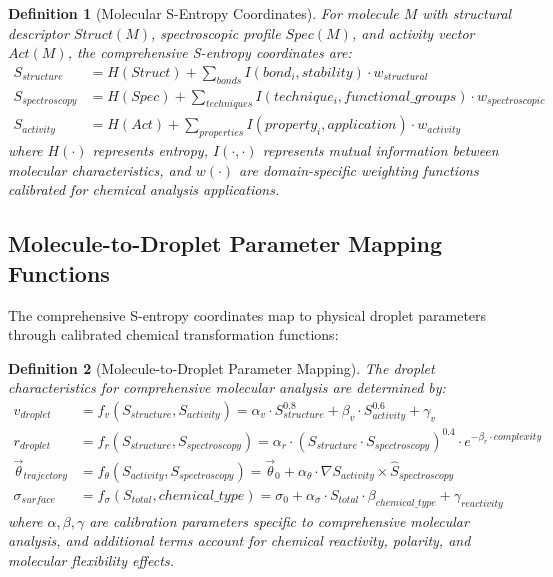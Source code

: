 \documentclass[12pt,a4paper]{article}
\newtheorem{definition}{Definition}
\begin{document}
\begin{definition}[Molecular S-Entropy Coordinates]
For molecule $M$ with structural descriptor $Struct(M)$, spectroscopic profile $Spec(M)$, and activity vector $Act(M)$, the comprehensive S-entropy coordinates are:
\begin{align}
S_{structure} &= H(Struct) + \sum_{bonds} I(bond_i, stability) \cdot w_{structural} \\
S_{spectroscopy} &= H(Spec) + \sum_{techniques} I(technique_i, functional\_groups) \cdot w_{spectroscopic} \\
S_{activity} &= H(Act) + \sum_{properties} I(property_i, application) \cdot w_{activity}
\end{align}
where $H(\cdot)$ represents entropy, $I(\cdot,\cdot)$ represents mutual information between molecular characteristics, and $w(\cdot)$ are domain-specific weighting functions calibrated for chemical analysis applications.
\end{definition}

\subsection{Molecule-to-Droplet Parameter Mapping Functions}

The comprehensive S-entropy coordinates map to physical droplet parameters through calibrated chemical transformation functions:

\begin{definition}[Molecule-to-Droplet Parameter Mapping]
The droplet characteristics for comprehensive molecular analysis are determined by:
\begin{align}
v_{droplet} &= f_v(S_{structure}, S_{activity}) = \alpha_v \cdot S_{structure}^{0.8} + \beta_v \cdot S_{activity}^{0.6} + \gamma_v \\
r_{droplet} &= f_r(S_{structure}, S_{spectroscopy}) = \alpha_r \cdot (S_{structure} \cdot S_{spectroscopy})^{0.4} \cdot e^{-\beta_r \cdot complexity} \\
\vec{\theta}_{trajectory} &= f_\theta(S_{activity}, S_{spectroscopy}) = \vec{\theta}_0 + \alpha_\theta \cdot \nabla S_{activity} \times \hat{S}_{spectroscopy} \\
\sigma_{surface} &= f_\sigma(S_{total}, chemical\_type) = \sigma_0 + \alpha_\sigma \cdot S_{total} \cdot \beta_{chemical\_type} + \gamma_{reactivity}
\end{align}
where $\alpha, \beta, \gamma$ are calibration parameters specific to comprehensive molecular analysis, and additional terms account for chemical reactivity, polarity, and molecular flexibility effects.
\end{definition}
\end{document}
